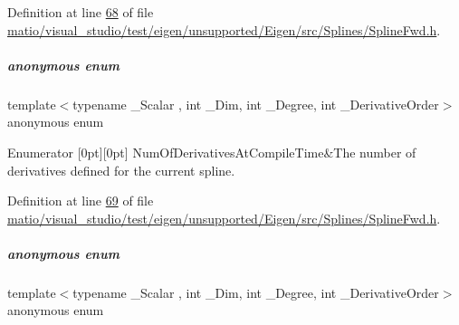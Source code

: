 Definition at line \hyperlink{matio_2visual__studio_2test_2eigen_2unsupported_2_eigen_2src_2_splines_2_spline_fwd_8h_source_l00068}{68} of file \hyperlink{matio_2visual__studio_2test_2eigen_2unsupported_2_eigen_2src_2_splines_2_spline_fwd_8h_source}{matio/visual\+\_\+studio/test/eigen/unsupported/\+Eigen/src/\+Splines/\+Spline\+Fwd.\+h}.

\mbox{\label{group___splines___module_a96228f861ee39497b9092c6fd20eed35}} 
\subparagraph{\texorpdfstring{anonymous enum}{anonymous enum}}
{\footnotesize\ttfamily template$<$typename \+\_\+\+Scalar , int \+\_\+\+Dim, int \+\_\+\+Degree, int \+\_\+\+Derivative\+Order$>$ \\
anonymous enum}

\begin{DoxyEnumFields}{Enumerator}
[0pt][0pt]{}\mbox{\label{group___splines___module_a96228f861ee39497b9092c6fd20eed35a24665032b11607201b7f394588f03f05}} 
Num\+Of\+Derivatives\+At\+Compile\+Time&The number of derivatives defined for the current spline. \\
\hline

\end{DoxyEnumFields}


Definition at line \hyperlink{matio_2visual__studio_2test_2eigen_2unsupported_2_eigen_2src_2_splines_2_spline_fwd_8h_source_l00069}{69} of file \hyperlink{matio_2visual__studio_2test_2eigen_2unsupported_2_eigen_2src_2_splines_2_spline_fwd_8h_source}{matio/visual\+\_\+studio/test/eigen/unsupported/\+Eigen/src/\+Splines/\+Spline\+Fwd.\+h}.

\mbox{\label{group___splines___module_a3d4de3f96ecb4755e1d7782bf8275c5d}} 
\subparagraph{\texorpdfstring{anonymous enum}{anonymous enum}}
{\footnotesize\ttfamily template$<$typename \+\_\+\+Scalar , int \+\_\+\+Dim, int \+\_\+\+Degree, int \+\_\+\+Derivative\+Order$>$ \\
anonymous enum}

